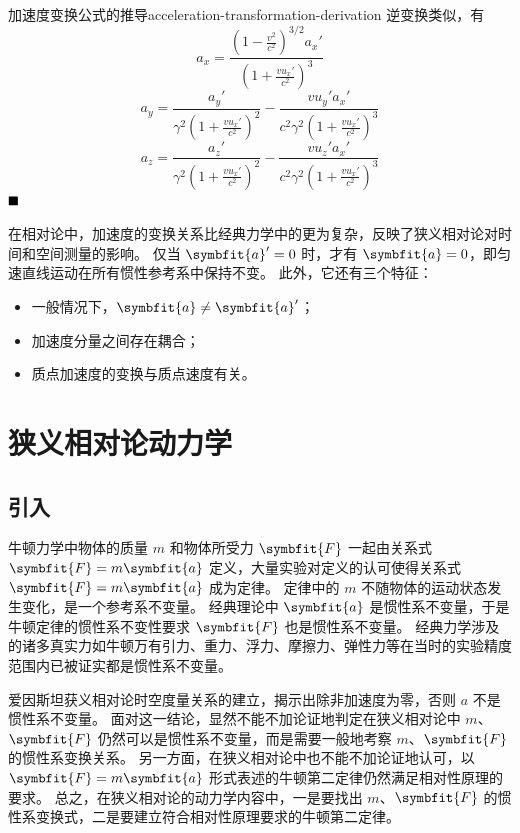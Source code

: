 \begin{example}{加速度变换公式的推导}{acceleration-transformation-derivation}
    逆变换类似，有
    \begin{equation}
        a_x = \frac{(1 - \frac{v^2}{c^2})^{3/2} a_x'}{\left(1 + \frac{v u_x'}{c^2}\right)^3}
    \end{equation}
    \begin{equation}
        a_y = \frac{a_y'}{\gamma^2 \left(1 + \frac{v u_x'}{c^2}\right)^2} - \frac{v u_y' a_x'}{c^2 \gamma^2 \left(1 + \frac{v u_x'}{c^2}\right)^3}
    \end{equation}
    \begin{equation}
        a_z = \frac{a_z'}{\gamma^2 \left(1 + \frac{v u_x'}{c^2}\right)^2} - \frac{v u_z' a_x'}{c^2 \gamma^2 \left(1 + \frac{v u_x'}{c^2}\right)^3}
    \end{equation}
    $\hfill\blacksquare$

    在相对论中，加速度的变换关系比经典力学中的更为复杂，反映了狭义相对论对时间和空间测量的影响。
    仅当 $\symbfit{a}' = 0$ 时，才有 $\symbfit{a} = 0$，即匀速直线运动在所有惯性参考系中保持不变。
    此外，它还有三个特征：
    \begin{itemize}
        \item 一般情况下，$\symbfit{a} \neq \symbfit{a}'$；
        \item 加速度分量之间存在耦合；
        \item 质点加速度的变换与质点速度有关。
    \end{itemize}
\end{example}

\section{狭义相对论动力学}

\subsection{引入}

牛顿力学中物体的质量 $m$ 和物体所受力 $\symbfit{F}$ 一起由关系式 $ \symbfit{F} = m \symbfit{a} $ 定义，大量实验对定义的认可使得关系式 $ \symbfit{F} = m \symbfit{a}$ 成为定律。
定律中的 $m$ 不随物体的运动状态发生变化，是一个参考系不变量。
经典理论中 $\symbfit{a}$ 是惯性系不变量，于是牛顿定律的惯性系不变性要求 $\symbfit{F}$ 也是惯性系不变量。
经典力学涉及的诸多真实力如牛顿万有引力、重力、浮力、摩擦力、弹性力等在当时的实验精度范围内已被证实都是惯性系不变量。

爱因斯坦获义相对论时空度量关系的建立，揭示出除非加速度为零，否则 $a$ 不是惯性系不变量。
面对这一结论，显然不能不加论证地判定在狭义相对论中 $m$、$\symbfit{F}$ 仍然可以是惯性系不变量，而是需要一般地考察 $m$、$\symbfit{F}$ 的惯性系变换关系。
另一方面，在狭义相对论中也不能不加论证地认可，以 $ \symbfit{F} = m \symbfit{a} $ 形式表述的牛顿第二定律仍然满足相对性原理的要求。
总之，在狭义相对论的动力学内容中，一是要找出 $m$、$\symbfit{F}$ 的惯性系变换式，二是要建立符合相对性原理要求的牛顿第二定律。

